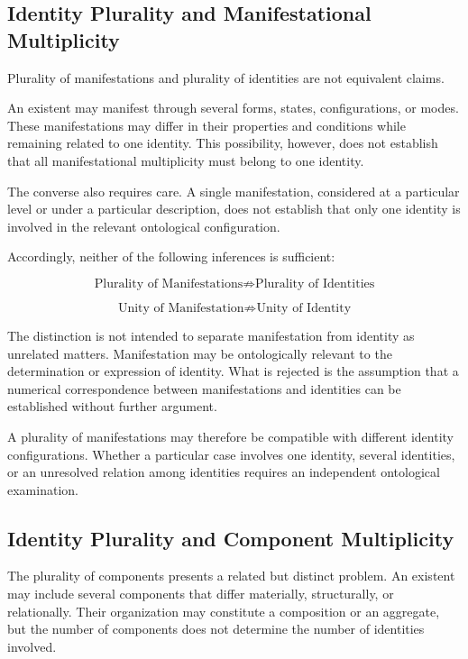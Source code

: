 \subsection{Identity Plurality and Manifestational Multiplicity}

Plurality of manifestations and plurality of identities
are not equivalent claims.

An existent may manifest through several forms, states,
configurations, or modes. These manifestations may differ
in their properties and conditions while remaining related
to one identity. This possibility, however, does not establish
that all manifestational multiplicity must belong to one
identity.

The converse also requires care. A single manifestation,
considered at a particular level or under a particular
description, does not establish that only one identity
is involved in the relevant ontological configuration.

Accordingly, neither of the following inferences is
sufficient:

\[
\text{Plurality of Manifestations}
\not\Rightarrow
\text{Plurality of Identities}
\]

\[
\text{Unity of Manifestation}
\not\Rightarrow
\text{Unity of Identity}
\]

The distinction is not intended to separate manifestation
from identity as unrelated matters. Manifestation may be
ontologically relevant to the determination or expression
of identity. What is rejected is the assumption that a
numerical correspondence between manifestations and
identities can be established without further argument.

A plurality of manifestations may therefore be compatible
with different identity configurations. Whether a particular
case involves one identity, several identities, or an
unresolved relation among identities requires an independent
ontological examination.

\subsection{Identity Plurality and Component Multiplicity}

The plurality of components presents a related but distinct
problem. An existent may include several components that
differ materially, structurally, or relationally. Their
organization may constitute a composition or an aggregate,
but the number of components does not determine the number
of identities involved.

